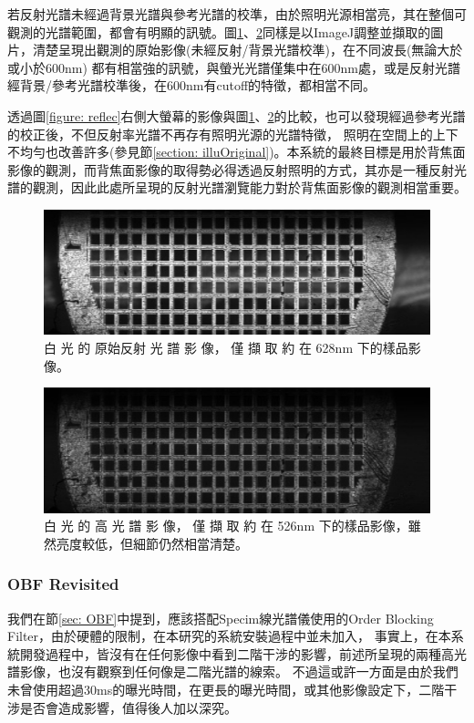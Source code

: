 \documentclass[12pt]{article}
\begin{document}
若反射光譜未經過背景光譜與參考光譜的校準，由於照明光源相當亮，其在整個可觀測的光譜範圍，都會有明顯的訊號。圖\ref{fig: reflec628}、\ref{fig: reflec526}同樣是以ImageJ調整並擷取的圖片，清楚呈現出觀測的原始影像(未經反射/背景光譜校準)，在不同波長(無論大於或小於600nm)
都有相當強的訊號，與螢光光譜僅集中在600nm處，或是反射光譜經背景/參考光譜校準後，在600nm有cutoff的特徵，都相當不同。

透過圖\ref{figure: reflec}右側大螢幕的影像與圖\ref{fig: reflec628}、\ref{fig: reflec526}的比較，也可以發現經過參考光譜的校正後，不但反射率光譜不再存有照明光源的光譜特徵，
照明在空間上的上下不均勻也改善許多(參見節\ref{section: illuOriginal})。本系統的最終目標是用於背焦面影像的觀測，而背焦面影像的取得勢必得透過反射照明的方式，其亦是一種反射光譜的觀測，因此此處所呈現的反射光譜瀏覽能力對於背焦面影像的觀測相當重要。

\begin{figure}
    \centering
    \includegraphics[width = 0.9\linewidth]{1211_10um_10ms-1.jpg}
    \caption{白 光 的 原始反射 光 譜 影 像， 僅 擷 取 約 在
    628nm 下的樣品影像。}
    \label{fig: reflec628}
\end{figure}

\begin{figure}
    \centering
    \includegraphics[width = 0.9\linewidth]{1211_10um_10ms137-1.jpg}
    \caption[白 光 的 原始反射 光 譜 影 像， 僅 擷 取 約 在
    526nm 下的樣品影像]{白 光 的 高 光 譜 影 像， 僅 擷 取 約 在
    526nm 下的樣品影像，雖然亮度較低，但細節仍然相當清楚。}
    \label{fig: reflec526}
\end{figure}

\subsubsection{OBF Revisited}
我們在節\ref{sec: OBF}中提到，應該搭配Specim線光譜儀使用的Order Blocking Filter，由於硬體的限制，在本研究的系統安裝過程中並未加入，
事實上，在本系統開發過程中，皆沒有在任何影像中看到二階干涉的影響，前述所呈現的兩種高光譜影像，也沒有觀察到任何像是二階光譜的線索。
不過這或許一方面是由於我們未曾使用超過30ms的曝光時間，在更長的曝光時間，或其他影像設定下，二階干涉是否會造成影響，值得後人加以深究。
\end{document}
